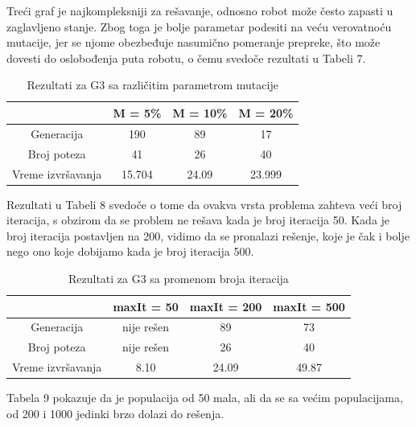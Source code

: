 \documentclass[12pt]{article}
\begin{document}
 \par Treći graf je najkompleksniji za rešavanje, odnosno robot može često zapasti u zaglavljeno stanje. Zbog toga je bolje parametar podesiti na veću verovatnoću mutacije, jer se njome obezbeđuje nasumično pomeranje prepreke, što može dovesti do oslobođenja puta robotu, o čemu svedoče rezultati u Tabeli 7. 

	\begin {table}[H]
\begin{center}
	\caption {Rezultati za G3 sa različitim parametrom mutacije} \label{tab:title} 
	\begin{tabular}{|| c|c c c||} 	
		\hline
		& M = 5\% & M = 10\% & M = 20\% \\ 
		\hline\hline
		Generacija & 190 & 89 & 17  \\ 
		\hline
		Broj poteza & 41 & 26 & 40 \\
		\hline
		Vreme izvršavanja & 15.704 & 24.09 & 23.999 \\
		\hline
	\end{tabular}
\end{center}
\end{table}

	\par Rezultati u Tabeli 8 svedoče o tome da ovakva vrsta problema zahteva veći broj iteracija, s obzirom da se problem ne rešava kada je broj iteracija 50. Kada je broj iteracija postavljen na 200, vidimo da se pronalazi rešenje, koje je čak i bolje nego ono koje dobijamo kada je broj iteracija 500. 

	\begin {table}[H]
\begin{center}
	\caption {Rezultati za G3 sa promenom broja iteracija} \label{tab:title} 
	\begin{tabular}{|| c|c c c||} 	
		\hline
		& maxIt = 50 & maxIt = 200 & maxIt = 500 \\ 
		\hline\hline
		Generacija &  nije rešen & 89 & 73  \\ 
		\hline
		Broj poteza &  nije rešen& 26 & 40\\
		\hline
		Vreme izvršavanja & 8.10 & 24.09 & 49.87 \\
		\hline
	\end{tabular}
\end{center}
\end{table}

	\par Tabela 9 pokazuje da je populacija od 50 mala, ali da se sa većim populacijama, od 200 i 1000 jedinki brzo dolazi do rešenja. 
\end{document}
